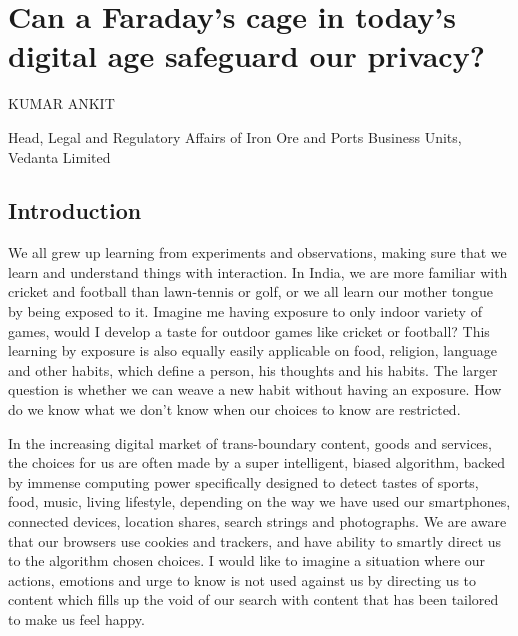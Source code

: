 \chapter{Can a Faraday’s cage in today’s digital age safeguard our privacy?}
\vskip -15pt


\begin{center}
{\large\uppercase{Kumar Ankit}} 

\vskip -6pt

Head, Legal and Regulatory Affairs of Iron Ore and Ports Business Units, Vedanta Limited

\end{center}

\vskip 2.3cm



\vfill
\newpage

\begin{multicols}{2}

\section{Introduction}

We all grew up learning from experiments and observations, making sure that we learn and understand things with interaction. In India, we are more familiar with cricket and football than lawn-tennis or golf, or we all learn our mother tongue by being exposed to it. Imagine me having exposure to only indoor variety of games, would I develop a taste for outdoor games like cricket or football? This learning by exposure is also equally easily applicable on food, religion, language and other habits, which define a person, his thoughts and his habits. The larger question is whether we can weave a new habit without having an exposure. How do we know what we don’t know when our choices to know are restricted. 

In the increasing digital market of trans-boundary content, goods and services, the choices for us are often made by a super intelligent, biased algorithm, backed by immense computing power specifically designed to detect tastes of sports, food, music, living lifestyle, depending on the way we have used our smartphones, connected devices, location shares, search strings and photographs. We are aware that our browsers use cookies and trackers, and have ability to smartly direct us to the algorithm chosen choices. I would like to imagine a situation where our actions, emotions and urge to know is not used against us by directing us to content which fills up the void of our search with content that has been tailored to make us feel happy.


\end{multicols}
